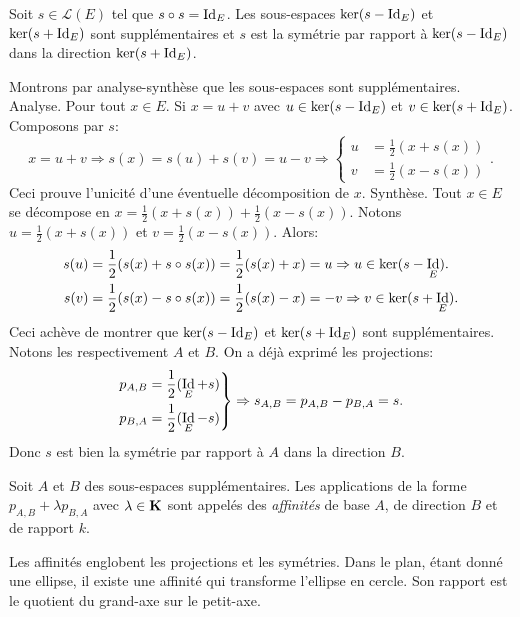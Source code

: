 \begin{prop}
 Soit $s\in \mathcal L(E)$ tel que $s\circ s = \mathop{\mathrm{Id}}_E$. Les sous-espaces $\ker(s-\mathop{\mathrm{Id}}_E)$ et $\ker(s+\mathop{\mathrm{Id}}_E)$ sont supplémentaires et $s$ est la symétrie par rapport à $\ker(s-\mathop{\mathrm{Id}}_E)$ dans la direction $\ker(s+\mathop{\mathrm{Id}}_E)$.
\end{prop}
\begin{demo}
 Montrons par analyse-synthèse que les sous-espaces sont supplémentaires.\newline
 Analyse. Pour tout $x\in E$. Si $x = u +v$ avec $u\in \ker(s-\mathop{\mathrm{Id}}_E)$ et $v \in \ker(s+\mathop{\mathrm{Id}}_E)$. Composons par $s$:
\[
  x = u + v \Rightarrow s(x) = s(u) + s(v) = u  - v
  \Rightarrow 
  \left\lbrace
  \begin{aligned}
    u &= \frac{1}{2}(x + s(x)) \\ v &= \frac{1}{2}(x - s(x))
  \end{aligned}
  \right. .
\]
Ceci prouve l'unicité d'une éventuelle décomposition de $x$.\newline
Synthèse. Tout $x\in E$ se décompose en $x = \frac{1}{2}(x + s(x)) + \frac{1}{2}(x - s(x))$. Notons $ u = \frac{1}{2}(x + s(x))$ et $v = \frac{1}{2}(x - s(x))$. Alors:
\[
  \begin{aligned}
    s(u) &= \frac{1}{2}(s(x) + s\circ s(x)) = \frac{1}{2}(s(x) + x) = u \Rightarrow u \in \ker(s - \mathop{\mathrm{Id}}_E).\\
    s(v) &= \frac{1}{2}(s(x) - s\circ s(x)) = \frac{1}{2}(s(x) - x) = -v \Rightarrow v \in \ker(s + \mathop{\mathrm{Id}}_E).
  \end{aligned}
\]
Ceci achève de montrer que $\ker(s - \mathop{\mathrm{Id}}_E)$ et $\ker(s + \mathop{\mathrm{Id}}_E)$ sont supplémentaires. Notons les respectivement $A$ et $B$. On a déjà exprimé les projections:
\[
  \left. 
  \begin{aligned}
    p_{A,B} &= \frac{1}{2}(\mathop{\mathrm{Id}}_E + s)\\ p_{B,A} &= \frac{1}{2}(\mathop{\mathrm{Id}}_E - s)
  \end{aligned}
  \right\rbrace \Rightarrow
  s_{A,B} = p_{A,B} - p_{B,A} = s.
\]
Donc $s$ est bien la symétrie par rapport à $A$ dans la direction $B$.
\end{demo}

\begin{defi}[affinité]
 Soit $A$ et $B$ des sous-espaces supplémentaires. Les applications de la forme $p_{A,B} + \lambda p_{B,A}$ avec $\lambda\in \mathbf{K}$ sont appelés des \emph{affinités} de base $A$, de direction $B$ et de rapport $k$.
\end{defi}
Les affinités englobent les projections et les symétries. Dans le plan, étant donné une ellipse, il existe une affinité qui transforme l'ellipse en cercle. Son rapport est le quotient du grand-axe sur le petit-axe.

